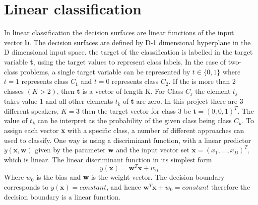 \chapter{Linear classification}
In linear classification the decision surfaces are linear functions of the input vector \textbf{b}. 
The decision surfaces are defined by D-1 dimensional hyperplane in the D dimensional input space.
the target of the classification is labelled in the target variable \textbf{t}, using the target values to represent class labels. 
In the case of two-class problems, a single target variable can be represented by $t\in \lbrace 0,1\rbrace$ where $t = 1$ represents class $C_1$ and $t = 0$ represents class $C_2$.
If the is more than 2 classes $(K>2)$, then \textbf{t} is a vector of length K.
For Class $C_j$ the element $t_j$ takes value 1 and all other elements $t_k$ of \textbf{t} are zero.
In this project there are 3 different speakers, $K = 3$ then the target vector for class 3 be $\textbf{t} = (0, 0, 1)^T$.
The value of $t_k$ can be interpret as the probability of the given class being class $C_k$.
To assign each vector \textbf{x} with a specific class, a number of different approaches can used to classify.
One way is using a discriminant function, with a linear predictor $y(\textbf{x},\textbf{w})$ given by the parameter \textbf{w} and the input vector set $\textbf{x}=(x_1,...,x_D)^T$, which is linear. 
The linear discriminant function in its simplest form
\begin{equation}
y(\textbf{x}) = \textbf{w}^T \textbf{x}+w_0
\label{eq:lineDis}
\end{equation}
Where $w_0$ is the bias and \textbf{w} is the weight vector.
The decision boundary corresponds to $y(\textbf{x})=constant$, and hence $\textbf{w}^T \textbf{x}+w_0 = constant$ therefore the decision boundary is a linear function.
